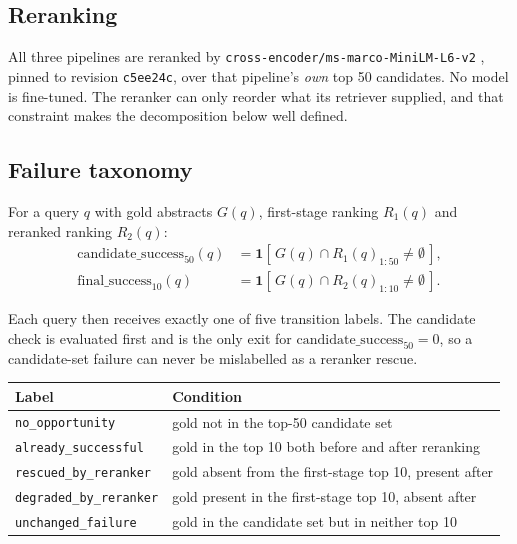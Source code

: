 \documentclass[11pt,a4paper]{article}
\newcommand{\cand}{\ensuremath{\mathrm{candidate\_success}_{50}}}
\newcommand{\fin}{\ensuremath{\mathrm{final\_success}_{10}}}
\begin{document}
\subsection{Reranking}
\label{sec:reranking}

All three pipelines are reranked by \texttt{cross-encoder/ms-marco-MiniLM-L6-v2}
\citep{nogueira2019passage,bajaj2016msmarco}, pinned to revision \texttt{c5ee24c}, over that
pipeline's \emph{own} top 50 candidates. No model is fine-tuned. The reranker can only reorder
what its retriever supplied, and that constraint makes the decomposition below well defined.

\subsection{Failure taxonomy}
\label{sec:taxonomy}

For a query $q$ with gold abstracts $G(q)$, first-stage ranking $R_1(q)$ and reranked ranking
$R_2(q)$:
\begin{align}
  \cand(q) &= \mathbf{1}\!\left[\, G(q) \cap R_1(q)_{1:50} \neq \emptyset \,\right], \\
  \fin(q)  &= \mathbf{1}\!\left[\, G(q) \cap R_2(q)_{1:10} \neq \emptyset \,\right].
\end{align}

Each query then receives exactly one of five transition labels. The candidate check is
evaluated first and is the only exit for $\cand = 0$, so a candidate-set failure can never be
mislabelled as a reranker rescue.

\begin{center}
\small
\begin{tabular}{ll}
\toprule
\textbf{Label} & \textbf{Condition} \\
\midrule
\texttt{no\_opportunity}      & gold not in the top-50 candidate set \\
\texttt{already\_successful}  & gold in the top 10 both before and after reranking \\
\texttt{rescued\_by\_reranker}  & gold absent from the first-stage top 10, present after \\
\texttt{degraded\_by\_reranker} & gold present in the first-stage top 10, absent after \\
\texttt{unchanged\_failure}   & gold in the candidate set but in neither top 10 \\
\bottomrule
\end{tabular}
\end{center}
\end{document}
